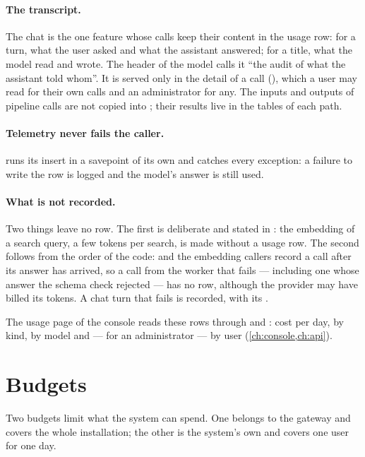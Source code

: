 \paragraph{The transcript.} The chat is the one feature whose calls keep their content in the
usage row: for a turn, what the user asked and what the assistant answered; for a title, what
the model read and wrote. The header of the model calls
it \enquote{the audit of what the assistant told whom}. It is served only in the detail of a
call (), which a user may read for their own calls and an
administrator for any. The inputs and outputs of pipeline calls are not copied into
; their results live in the tables of each path.

\paragraph{Telemetry never fails the caller.}  runs its insert in a
savepoint of its own and catches every exception: a failure to write the row is logged and the
model's answer is still used.

\paragraph{What is not recorded.} Two things leave no row. The first is deliberate and stated
in : the embedding of a search query, a few tokens per search, is
made without a usage row. The second follows from the order of the code:  and
the embedding callers record a call after its answer has arrived, so a call from the worker
that fails --- including one whose answer the schema check rejected --- has no row, although the
provider may have billed its tokens. A chat turn that fails is recorded, with its
.

The usage page of the console reads these rows through  and
: cost per day, by kind, by model and --- for an administrator ---
by user (\cref{ch:console,ch:api}).


\section{Budgets}\label{sec:models:budgets}

Two budgets limit what the system can spend. One belongs to the gateway and covers the whole
installation; the other is the system's own and covers one user for one day.

